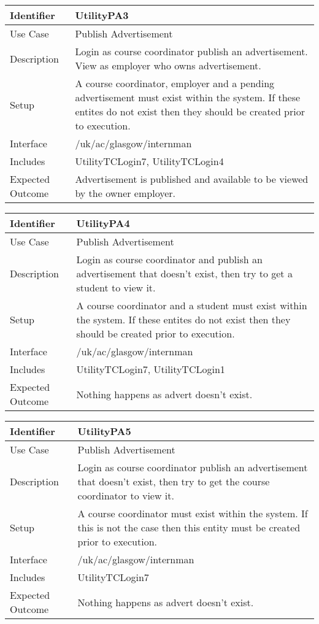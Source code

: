 \vspace{2em}

\begin{tabularx}{\textwidth}{|T|L|}
\hline
Identifier & UtilityPA3\\
\hline
Use Case & Publish Advertisement \\
\hline
Description & Login as course coordinator publish an
advertisement. View as employer who owns advertisement. \\
\hline
Setup & A course coordinator, employer and a pending advertisement
must exist within the system. If these entites do not exist then they
should be created prior to execution. \\
\hline
Interface & /uk/ac/glasgow/internman \\
\hline
Includes & UtilityTCLogin7, UtilityTCLogin4 \\
\hline
Expected Outcome & Advertisement is published and available to be viewed by the
owner employer.\\
\hline
\end{tabularx}

\vspace{2em}

\begin{tabularx}{\textwidth}{|T|L|}
\hline
Identifier & UtilityPA4\\
\hline
Use Case & Publish Advertisement \\
\hline
Description & Login as course coordinator and  publish an advertisement that
doesn't exist, then try to get a student to view it.\\
\hline
Setup & A course coordinator and a student must exist within the
system. If these entites do not exist then they should be created
prior to execution. \\
\hline
Interface & /uk/ac/glasgow/internman \\
\hline
Includes & UtilityTCLogin7, UtilityTCLogin1 \\
\hline
Expected Outcome & Nothing happens as advert doesn't exist.\\
\hline
\end{tabularx}

\vspace{2em}

\begin{tabularx}{\textwidth}{|T|L|}
\hline
Identifier & UtilityPA5\\
\hline
Use Case & Publish Advertisement \\
\hline
Description & Login as course coordinator publish an advertisement that
doesn't exist, then try to get the course coordinator to view it.\\
\hline
Setup & A course coordinator must exist within the system. If this is
not the case then this entity must be created prior to execution.  \\
\hline
Interface & /uk/ac/glasgow/internman \\
\hline
Includes & UtilityTCLogin7  \\
\hline
Expected Outcome & Nothing happens as advert doesn't exist.\\
\hline
\end{tabularx}

